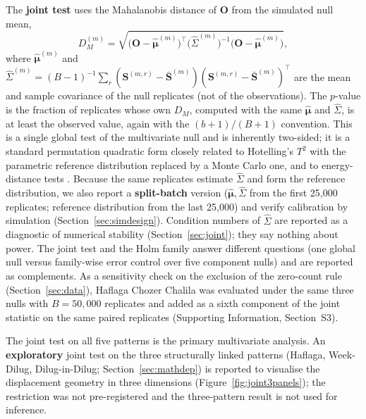 \documentclass[12pt]{article}
\newcommand{\DM}{D_{M}}
\begin{document}
The \textbf{joint test} uses the Mahalanobis distance of $\mathbf{O}$ from the simulated
null mean,
\begin{equation}
  \DM^{(m)} = \sqrt{\bigl(\mathbf{O}-\hat{\boldsymbol{\mu}}^{(m)}\bigr)^\top
               \bigl(\hat{\Sigma}^{(m)}\bigr)^{-1}
               \bigl(\mathbf{O}-\hat{\boldsymbol{\mu}}^{(m)}\bigr)},
  \label{eq:mahalanobis}
\end{equation}
where $\hat{\boldsymbol{\mu}}^{(m)}$ and $\hat\Sigma^{(m)} = (B-1)^{-1}\sum_r
(\mathbf{S}^{(m,r)} - \bar{\mathbf{S}}^{(m)})(\mathbf{S}^{(m,r)} - \bar{\mathbf{S}}^{(m)})^\top$
are the mean and sample covariance of the null replicates (not of the observations).
The $p$-value is the fraction of replicates whose own $\DM$, computed with the same
$\hat{\boldsymbol{\mu}}$ and $\hat\Sigma$, is at least the observed value, again with the
$(b+1)/(B+1)$ convention. This is a single global test of the multivariate null and is
inherently two-sided; it is a standard permutation quadratic form
\citep{anderson2001,pesarin2010} closely related to Hotelling's $T^2$ with the
parametric reference distribution replaced by a Monte Carlo one, and to energy-distance
tests \citep{szekely2013}. Because the same replicates estimate $\hat\Sigma$ and form the
reference distribution, we also report a \textbf{split-batch} version
($\hat{\boldsymbol{\mu}}, \hat\Sigma$ from the first 25,000 replicates; reference
distribution from the last 25,000) and verify calibration by simulation
(Section~\ref{sec:simdesign}). Condition numbers of $\hat\Sigma$ are reported as a
diagnostic of numerical stability (Section~\ref{sec:joint}); they say nothing about
power. The joint test and the Holm
family answer different questions (one global null versus family-wise error control over
five component nulls) and are reported as complements. As a sensitivity check on the
exclusion of the zero-count rule (Section~\ref{sec:data}), Haflaga Chozer Chalila was
evaluated under the same three nulls with $B = 50{,}000$ replicates and added as a sixth
component of the joint statistic on the same paired replicates (Supporting Information,
Section~S3).

The joint test on all five patterns is the primary multivariate analysis. An
\textbf{exploratory} joint test on the three structurally linked patterns (Haflaga,
Week-Dilug, Dilug-in-Dilug; Section~\ref{sec:mathdep}) is reported to visualise the
displacement geometry in three dimensions (Figure~\ref{fig:joint3panels}); the
restriction was not pre-registered and the three-pattern result is not used for
inference.
\end{document}
